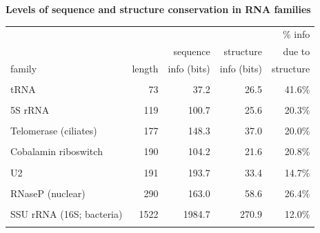 \documentclass[landscape]{slides}
\begin{document}
\begin{slide}
\begin{center}
\textbf{Levels of sequence and structure conservation in RNA families}
\end{center}
\medskip

\begin{center}
\small
\begin{tabular}{lrrrr} 
         &        &             &              & \% info \\
         &        & sequence    & structure    & due to  \\
  family & length & info (bits) & info (bits)  & structure \\ \hline
  \\
  tRNA   & 73     & 37.2      & 26.5         & 41.6\%    \\ 
  \\
  5S rRNA& 119    & 100.7     & 25.6         & 20.3\%    \\ 
  \\
  Telomerase (ciliates) & 177 & 148.3 & 37.0     & 20.0\%    \\
  \\
  Cobalamin riboswitch & 190 & 104.2 & 21.6      & 20.8\%    \\
  \\
  U2     & 191    & 193.7     & 33.4         & 14.7\%    \\ 
  \\
  RNaseP (nuclear) & 290    & 163.0     & 58.6 & 26.4\%    \\ 
  \\
  SSU rRNA (16S; bacteria) & 1522 & 1984.7 & 270.9      &  12.0\% \\
  \\
\end{tabular}
\end{center}

\vfill

\end{slide}
\end{document}
